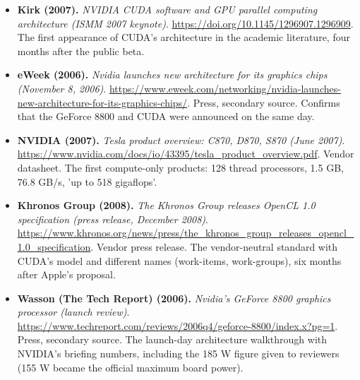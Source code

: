 \documentclass[11pt,letterpaper]{article}
\begin{document}
\begin{itemize}[leftmargin=1.2em,itemsep=3pt]
\item \textbf{Kirk (2007).} \textit{NVIDIA CUDA software and GPU parallel computing architecture (ISMM 2007 keynote)}. \url{https://doi.org/10.1145/1296907.1296909}. The first appearance of CUDA's architecture in the academic literature, four months after the public beta.
\item \textbf{eWeek (2006).} \textit{Nvidia launches new architecture for its graphics chips (November 8, 2006)}. \url{https://www.eweek.com/networking/nvidia-launches-new-architecture-for-its-graphics-chips/}. Press, secondary source. Confirms that the GeForce 8800 and CUDA were announced on the same day.
\item \textbf{NVIDIA (2007).} \textit{Tesla product overview: C870, D870, S870 (June 2007)}. \url{https://www.nvidia.com/docs/io/43395/tesla_product_overview.pdf}. Vendor datasheet. The first compute-only products: 128 thread processors, 1.5 GB, 76.8 GB/s, 'up to 518 gigaflops'.
\item \textbf{Khronos Group (2008).} \textit{The Khronos Group releases OpenCL 1.0 specification (press release, December 2008)}. \url{https://www.khronos.org/news/press/the_khronos_group_releases_opencl_1.0_specification}. Vendor press release. The vendor-neutral standard with CUDA's model and different names (work-items, work-groups), six months after Apple's proposal.
\item \textbf{Wasson (The Tech Report) (2006).} \textit{Nvidia's GeForce 8800 graphics processor (launch review)}. \url{https://www.techreport.com/reviews/2006q4/geforce-8800/index.x?pg=1}. Press, secondary source. The launch-day architecture walkthrough with NVIDIA's briefing numbers, including the 185 W figure given to reviewers (155 W became the official maximum board power).
\end{itemize}
\end{document}
